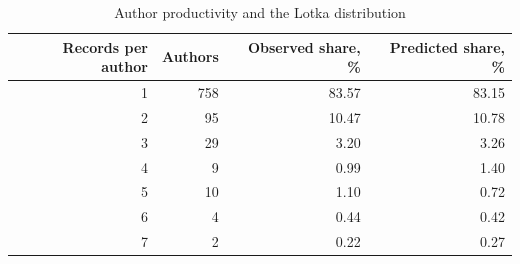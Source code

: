 \begin{table}[!ht]
\caption{Author productivity and the Lotka distribution}
\centering
\small
\begin{tabular}{@{}rrrr@{}}
\toprule
Records per author & Authors & Observed share, \% & Predicted share, \% \\
\midrule
1 & 758 & 83.57 & 83.15 \\
2 & 95 & 10.47 & 10.78 \\
3 & 29 & 3.20 & 3.26 \\
4 & 9 & 0.99 & 1.40 \\
5 & 10 & 1.10 & 0.72 \\
6 & 4 & 0.44 & 0.42 \\
7 & 2 & 0.22 & 0.27 \\
\bottomrule
\end{tabular}
\end{table}
